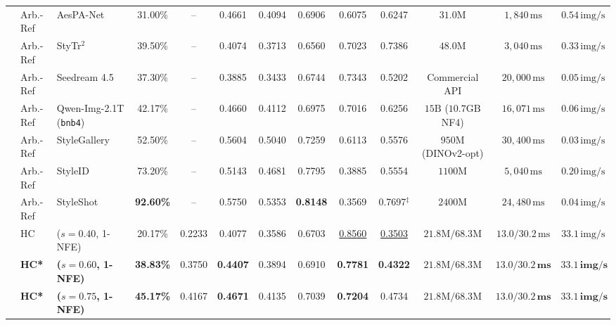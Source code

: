 \documentclass[conference]{IEEEtran}
\begin{document}
\begin{table}[t]
{\begin{tabular}{@{}lllcccccccccc@{}}
& Arb.-Ref & AesPA-Net~\cite{hong2023aespa} & 31.00\% & -- & 0.4661 & 0.4094 & 0.6906 & 0.6075 & 0.6247 & $31.0\text{M}$ & $1{,}840\,\text{ms}$ & $0.54\,\text{img/s}$ \\
& Arb.-Ref & StyTr$^2$~\cite{deng2022stytr2} & 39.50\% & -- & 0.4074 & 0.3713 & 0.6560 & 0.7023 & 0.7386 & $48.0\text{M}$ & $3{,}040\,\text{ms}$ & $0.33\,\text{img/s}$ \\
\midrule
{}
& Arb.-Ref & Seedream 4.5~\cite{seedream2025} & 37.30\% & -- & 0.3885 & 0.3433 & 0.6744 & 0.7343 & 0.5202 & Commercial API & $20{,}000\,\text{ms}$ & $0.05\,\text{img/s}$ \\
& Arb.-Ref & Qwen-Img-2.1T (\texttt{bnb4}) & 42.17\% & -- & 0.4660 & 0.4112 & 0.6975 & 0.7016 & 0.6256 & $15\text{B}$ ($10.7\text{GB}$ NF4) & $16{,}071\,\text{ms}$ & $0.06\,\text{img/s}$ \\
& Arb.-Ref & StyleGallery~\cite{he2026stylegallery} & 52.50\% & -- & 0.5604 & 0.5040 & 0.7259 & 0.6113 & 0.5576 & $950\text{M}$ (DINOv2-opt) & $30{,}400\,\text{ms}$ & $0.03\,\text{img/s}$ \\
& Arb.-Ref & StyleID~\cite{chung2024style} & 73.20\% & -- & 0.5143 & 0.4681 & 0.7795 & 0.3885 & 0.5554 & $1100\text{M}$ & $5{,}040\,\text{ms}$ & $0.20\,\text{img/s}$ \\
& Arb.-Ref & StyleShot~\cite{gao2024styleshot} & \textbf{92.60\%} & -- & 0.5750 & 0.5353 & \textbf{0.8148} & 0.3569 & 0.7697$^\ddagger$ & $2400\text{M}$ & $24{,}480\,\text{ms}$ & $0.04\,\text{img/s}$ \\
\midrule
{}
& HC & \methodecore{} ($s=0.40$, 1-NFE) & 20.17\% & 0.2233 & 0.4077 & 0.3586 & 0.6703 & \underline{0.8560} & \underline{0.3503} & $21.8\text{M} / 68.3\text{M}$ & $13.0 / 30.2\,\text{ms}$ & $33.1\,\text{img/s}$ \\
& \textbf{HC*} & \textbf{\methodecore{} ($s=0.60$, 1-NFE)} & \textbf{38.83\%} & 0.3750 & \textbf{0.4407} & 0.3894 & 0.6910 & \textbf{0.7781} & \textbf{0.4322} & $21.8\text{M} / 68.3\text{M}$ & $\mathbf{13.0 / 30.2\,\text{ms}}$ & $\mathbf{33.1\,\text{img/s}}$ \\
& \textbf{HC*} & \textbf{\methodecore{} ($s=0.75$, 1-NFE)} & \textbf{45.17\%} & 0.4167 & \textbf{0.4671} & 0.4135 & 0.7039 & \textbf{0.7204} & 0.4734 & $21.8\text{M} / 68.3\text{M}$ & $\mathbf{13.0 / 30.2\,\text{ms}}$ & $\mathbf{33.1\,\text{img/s}}$ \\

\end{tabular}}
\end{table}
\end{document}
